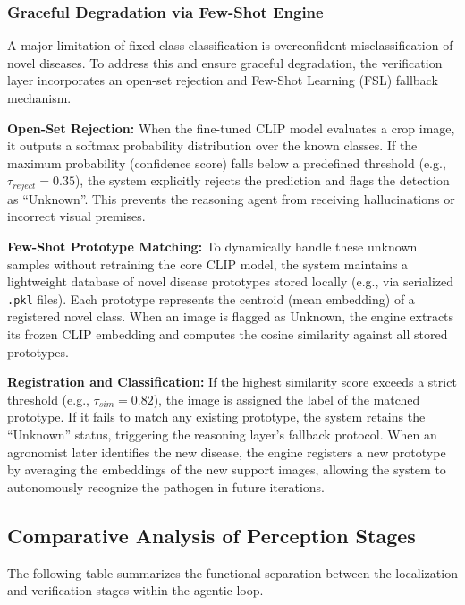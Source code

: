 \subsubsection{Graceful Degradation via Few-Shot Engine}
A major limitation of fixed-class classification is overconfident misclassification of novel diseases. To address this and ensure graceful degradation, the verification layer incorporates an open-set rejection and Few-Shot Learning (FSL) fallback mechanism.

\textbf{Open-Set Rejection:} When the fine-tuned CLIP model evaluates a crop image, it outputs a softmax probability distribution over the known classes. If the maximum probability (confidence score) falls below a predefined threshold (e.g., $\tau_{reject} = 0.35$), the system explicitly rejects the prediction and flags the detection as ``Unknown''. This prevents the reasoning agent from receiving hallucinations or incorrect visual premises.

\textbf{Few-Shot Prototype Matching:} To dynamically handle these unknown samples without retraining the core CLIP model, the system maintains a lightweight database of novel disease prototypes stored locally (e.g., via serialized \texttt{.pkl} files). Each prototype represents the centroid (mean embedding) of a registered novel class. When an image is flagged as Unknown, the engine extracts its frozen CLIP embedding and computes the cosine similarity against all stored prototypes. 

\textbf{Registration and Classification:} If the highest similarity score exceeds a strict threshold (e.g., $\tau_{sim} = 0.82$), the image is assigned the label of the matched prototype. If it fails to match any existing prototype, the system retains the ``Unknown'' status, triggering the reasoning layer's fallback protocol. When an agronomist later identifies the new disease, the engine registers a new prototype by averaging the embeddings of the new support images, allowing the system to autonomously recognize the pathogen in future iterations.


\subsection{Comparative Analysis of Perception Stages}
The following table summarizes the functional separation between the localization and verification stages within the agentic loop.

